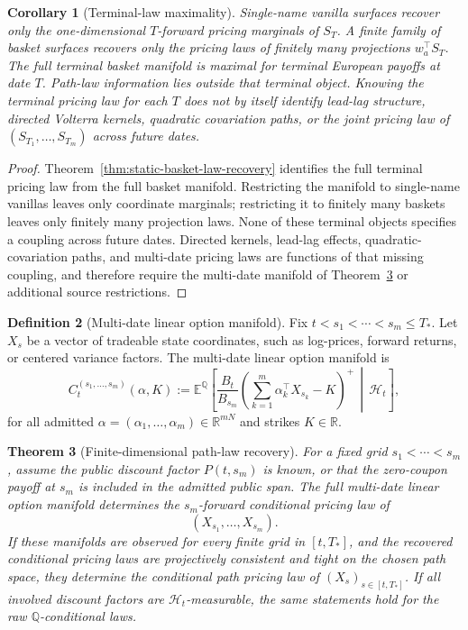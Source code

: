 \documentclass[11pt,a4paper]{amsart}
\theoremstyle{plain}
\newtheorem{theorem}{Theorem}[section]
\newtheorem{corollary}[theorem]{Corollary}
\theoremstyle{definition}
\newtheorem{definition}[theorem]{Definition}
\theoremstyle{remark}
\newcommand{\R}{\mathbb{R}}
\newcommand{\QQ}{\mathbb{Q}}
\newcommand{\EE}{\mathbb{E}}
\newcommand{\cH}{\mathcal{H}}
\begin{document}
\begin{corollary}[Terminal-law maximality]\label{cor:terminal-law-maximality}
Single-name vanilla surfaces recover only the one-dimensional \(T\)-forward pricing marginals of
\(S_T\).  A finite family of basket surfaces recovers only the pricing laws of finitely many
projections \(w_a^\top S_T\).  The full terminal basket manifold is maximal for terminal
European payoffs at date \(T\).  Path-law information lies outside that terminal object.  Knowing
the terminal pricing law for each \(T\) does not by itself identify lead-lag structure, directed Volterra kernels,
quadratic covariation paths, or the joint pricing law of
\((S_{T_1},\dots,S_{T_m})\) across future dates.
\end{corollary}

\begin{proof}
Theorem~\ref{thm:static-basket-law-recovery} identifies the full terminal pricing law from the full
basket manifold.  Restricting the manifold to single-name vanillas leaves only coordinate
marginals; restricting it to finitely many baskets leaves only finitely many projection laws.  None
of these terminal objects specifies a coupling across future dates.  Directed kernels,
lead-lag effects, quadratic-covariation paths, and multi-date pricing laws are functions of that
missing coupling, and therefore require the multi-date manifold of Theorem~\ref{thm:path-law-recovery}
or additional source restrictions.
\end{proof}


\begin{definition}[Multi-date linear option manifold]\label{def:multi-date-linear-manifold}
Fix \(t<s_1<\cdots<s_m\le T_\ast\).  Let \(X_s\) be a vector of tradeable state coordinates,
such as log-prices, forward returns, or centered variance factors.  The multi-date linear option
manifold is
\[
        C_t^{(s_1,\dots,s_m)}(\alpha,K)
        :=
        \EE^\QQ\!\left[
        \frac{B_t}{B_{s_m}}
        \left(\sum_{k=1}^m\alpha_k^\top X_{s_k}-K\right)^+
        \,\middle|\,\cH_t
        \right],
\]
for all admitted \(\alpha=(\alpha_1,\dots,\alpha_m)\in\R^{mN}\) and strikes \(K\in\R\).
\end{definition}

\begin{theorem}[Finite-dimensional path-law recovery]\label{thm:path-law-recovery}
For a fixed grid \(s_1<\cdots<s_m\), assume the public discount factor \(P(t,s_m)\) is known, or
that the zero-coupon payoff at \(s_m\) is included in the admitted public span.  The full
multi-date linear option manifold determines the \(s_m\)-forward conditional pricing law of
\[
        (X_{s_1},\dots,X_{s_m}).
\]
If these manifolds are observed for every finite grid in \([t,T_\ast]\), and the recovered
conditional pricing laws are projectively consistent and tight on the chosen path space, they
determine the conditional path pricing law of \((X_s)_{s\in[t,T_\ast]}\).  If all involved
discount factors are \(\cH_t\)-measurable, the same statements hold for the raw
\(\QQ\)-conditional laws.
\end{theorem}
\end{document}
